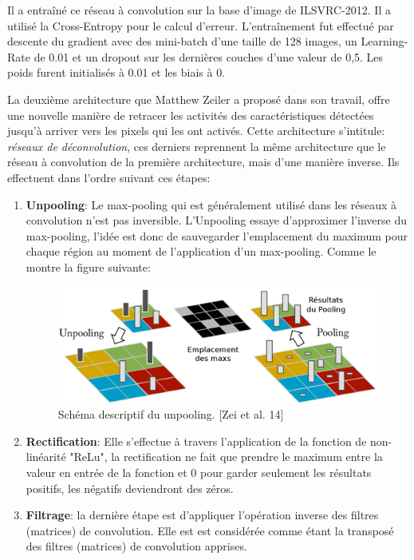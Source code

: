 	Il a entraîné ce réseau à convolution sur la base d'image de ILSVRC-2012. Il a utilisé la Cross-Entropy pour le calcul d'erreur. L’entraînement fut effectué par descente du gradient avec des mini-batch d'une taille de 128 images, un Learning-Rate de 0.01 et un dropout sur les dernières couches d'une valeur de 0,5. Les poids furent initialisés à 0.01 et les biais à 0.

	La deuxième architecture que Matthew Zeiler a proposé dans son travail, offre une nouvelle manière de retracer les activités des caractéristiques détectées jusqu'à arriver vers les pixels qui les ont activés. Cette architecture s'intitule: \textit{réseaux de déconvolution}, ces derniers reprennent la même architecture que le réseau à convolution de la première architecture, mais d'une manière inverse. Ils effectuent dans l'ordre suivant ces étapes:

\begin{enumerate}
\item \textbf{Unpooling}: Le max-pooling qui est généralement utilisé dans les réseaux à convolution n'est pas inversible. L'Unpooling essaye d'approximer l'inverse du max-pooling, l’idée est donc de sauvegarder l'emplacement du maximum pour chaque région au moment de l'application d'un max-pooling. Comme le montre la figure suivante:

\begin{figure}[H]
	\centering
		\includegraphics[width=5in]{Figures/unpooling.png}
	\caption[Res]{Schéma descriptif du unpooling. [Zei et al. 14]}
	\label{fig:Electron}
\end{figure}

\item \textbf{Rectification}: Elle s'effectue à travers l'application de la fonction de non-linéarité "ReLu", la rectification ne fait que prendre le maximum entre la valeur en entrée de la fonction et 0 pour garder seulement les résultats positifs, les négatifs deviendront des zéros.

\item \textbf{Filtrage}: la dernière étape est d'appliquer l'opération inverse des filtres (matrices) de convolution. Elle est est considérée comme étant la transposé des filtres (matrices) de convolution apprises.
\end{enumerate}

